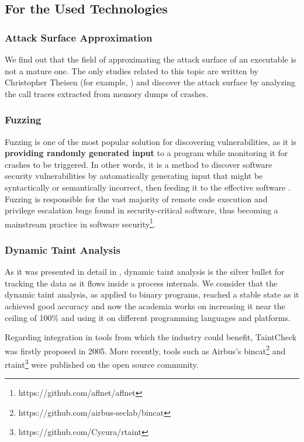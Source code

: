 \documentclass[12pt,a4paper,english,onecolumn]{IEEEtran}
\begin{document}
\subsection{For the Used Technologies}

\subsubsection{Attack Surface Approximation}

We find out that the field of approximating the attack surface of an executable is not a mature one. The only studies related to this topic are written by Christopher Theisen (for example, \cite{automated_approximation}) and discover the attack surface by analyzing the call traces extracted from memory dumps of crashes.

\subsubsection{Fuzzing}

Fuzzing is one of the most popular solution for discovering vulnerabilities, as it is \textbf{providing randomly generated input} to a program while monitoring it for crashes to be triggered. In other words, it is a method to discover software security vulnerabilities by automatically generating input that might be syntactically or semantically incorrect, then feeding it to the effective software \cite{fuzzing_survey}. Fuzzing is responsible for the vast majority of remote code execution and privilege escalation bugs found in security-critical software, thus becoming a mainstream practice in software security\footnote{https://github.com/aflnet/aflnet}.

\subsubsection{Dynamic Taint Analysis}

As it was presented in detail in \cite{dta_essay_repo}, dynamic taint analysis is the silver bullet for tracking the data as it flows inside a process internals. We consider that the dynamic taint analysis, as applied to binary programs, reached a stable state as it achieved good accuracy and now the academia works on increasing it near the ceiling of 100\% and using it on different programming languages and platforms.

Regarding integration in tools from which the industry could benefit, TaintCheck was firstly proposed in 2005. More recently, tools such as Airbus's bincat\footnote{https://github.com/airbus-seclab/bincat} and rtaint\footnote{https://github.com/Cycura/rtaint} were published on the open source community.
\end{document}
